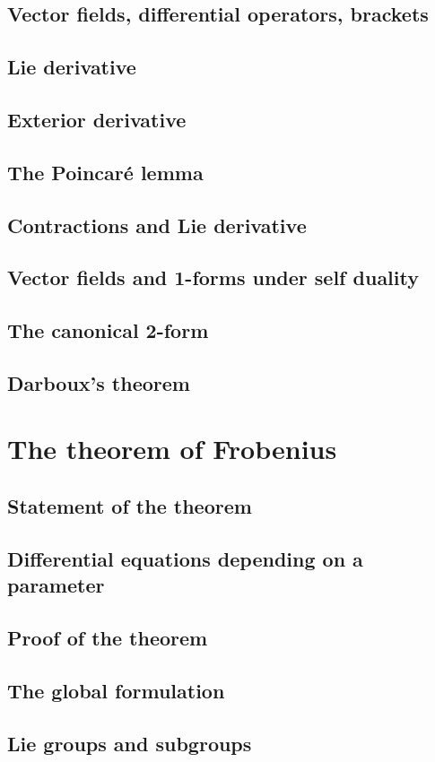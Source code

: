 \documentclass[a4paper]{article}
\begin{document}
\subsection{Vector fields, differential operators, brackets}

\subsection{Lie derivative}

\subsection{Exterior derivative}

\subsection{The Poincar\'e lemma}

\subsection{Contractions and Lie derivative}

\subsection{Vector fields and 1-forms under self duality}

\subsection{The canonical 2-form}

\subsection{Darboux's theorem}

\section{The theorem of Frobenius}

\subsection{Statement of the theorem}

\subsection{Differential equations depending on a parameter}

\subsection{Proof of the theorem}

\subsection{The global formulation}

\subsection{Lie groups and subgroups}
\end{document}
